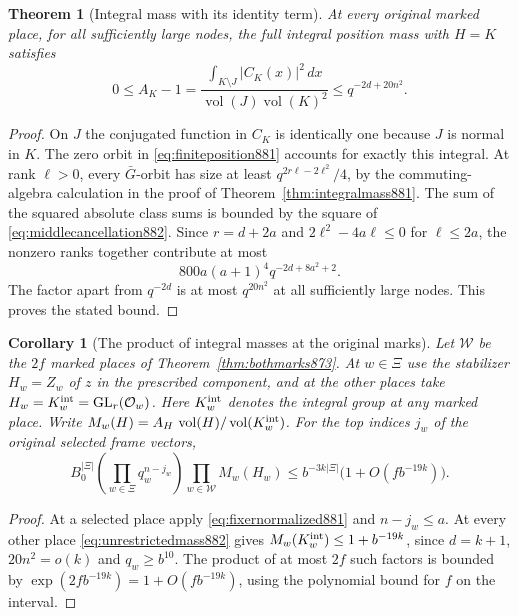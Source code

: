 \documentclass[a4paper,11pt]{article}
\newtheorem{theorem}[proposition]{Theorem}
\newtheorem{corollary}[proposition]{Corollary}
\theoremstyle{definition}
\theoremstyle{remark}
\numberwithin{equation}{section}
\begin{document}
\begin{theorem}[Integral mass with its identity term]
\leavevmode\label{thm:unrestrictedmass882}
At every original marked place, for all sufficiently large nodes,
the full integral position mass with \(H=K\) satisfies
\begin{equation}
 0\le A_K-1
   =\frac{\int_{K\setminus J}|C_K(x)|^2\,dx}
              {\operatorname{vol}(J)\operatorname{vol}(K)^2}
       \le q^{-2d+20n^2}.
 \label{eq:unrestrictedmass882}
\end{equation}
\end{theorem}
\begin{proof}
On \(J\) the conjugated function in \(C_K\) is identically one
because \(J\) is normal in \(K\). The zero orbit in
\eqref{eq:finiteposition881} accounts for exactly this integral.
At rank \(\ell>0\), every \(\bar G\)-orbit has size at least
\(q^{2r\ell-2\ell^2}/4\), by the commuting-algebra calculation in
the proof of Theorem~\ref{thm:integralmass881}. The sum of the
squared absolute class sums is bounded by the square of
\eqref{eq:middlecancellation882}. Since \(r=d+2a\) and
\(2\ell^2-4a\ell\le0\) for \(\ell\le2a\), the nonzero ranks
together contribute at most
\[
        800a(a+1)^4 q^{-2d+8a^2+2}.
\]
The factor apart from \(q^{-2d}\) is at most \(q^{20n^2}\) at
all sufficiently large nodes. This proves the stated bound.
\end{proof}

\begin{corollary}[The product of integral masses at the original marks]
\leavevmode\label{cor:integralproduct882}
Let \(\mathcal W\) be the \(2f\) marked places of
Theorem~\ref{thm:bothmarks873}. At \(w\in\Xi\) use the stabilizer
\(H_w=Z_w\) of \(z\) in the prescribed component, and at the
other places take \(H_w=K_w^{\rm int}=\mathrm{GL}_r(\mathcal O_w)\).
Here \(K_w^{\rm int}\) denotes the integral group at any marked place.
Write
\(M_w(H)=A_H\,\operatorname{vol}(H)/\operatorname{vol}(K_w^{\rm int})\).
For the top indices \(j_w\) of the original selected frame vectors,
\[
 B_0^{|\Xi|}
 \left(\prod_{w\in\Xi}q_w^{n-j_w}\right)
 \prod_{w\in\mathcal W} M_w(H_w)
      \le b^{-3k|\Xi|}\bigl(1+O(f b^{-19k})\bigr).
\]
\end{corollary}
\begin{proof}
At a selected place apply \eqref{eq:fixernormalized881} and
\(n-j_w\le a\). At every other place
\eqref{eq:unrestrictedmass882} gives \(M_w(K_w^{\rm int})\le
1+b^{-19k}\), since \(d=k+1\), \(20n^2=o(k)\) and \(q_w\ge b^{10}\).
The product of at most \(2f\) such factors is bounded by
\(\exp(2f b^{-19k})=1+O(f b^{-19k})\), using the polynomial
bound for \(f\) on the interval.
\end{proof}
\end{document}
